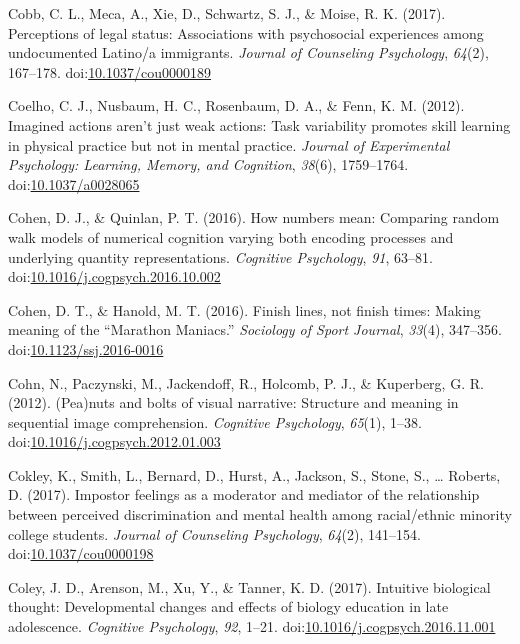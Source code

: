 \documentclass[english,man]{apa6}
\theoremstyle{definition}
\theoremstyle{definition}
\theoremstyle{definition}
\theoremstyle{remark}
\begin{document}
\hypertarget{ref-Cobb2017}{}
Cobb, C. L., Meca, A., Xie, D., Schwartz, S. J., \& Moise, R. K. (2017).
Perceptions of legal status: Associations with psychosocial experiences
among undocumented Latino/a immigrants. \emph{Journal of Counseling
Psychology}, \emph{64}(2), 167--178.
doi:\href{https://doi.org/10.1037/cou0000189}{10.1037/cou0000189}

\hypertarget{ref-Coelho2012}{}
Coelho, C. J., Nusbaum, H. C., Rosenbaum, D. A., \& Fenn, K. M. (2012).
Imagined actions aren't just weak actions: Task variability promotes
skill learning in physical practice but not in mental practice.
\emph{Journal of Experimental Psychology: Learning, Memory, and
Cognition}, \emph{38}(6), 1759--1764.
doi:\href{https://doi.org/10.1037/a0028065}{10.1037/a0028065}

\hypertarget{ref-Cohen2016}{}
Cohen, D. J., \& Quinlan, P. T. (2016). How numbers mean: Comparing
random walk models of numerical cognition varying both encoding
processes and underlying quantity representations. \emph{Cognitive
Psychology}, \emph{91}, 63--81.
doi:\href{https://doi.org/10.1016/j.cogpsych.2016.10.002}{10.1016/j.cogpsych.2016.10.002}

\hypertarget{ref-Cohen2016a}{}
Cohen, D. T., \& Hanold, M. T. (2016). Finish lines, not finish times:
Making meaning of the ``Marathon Maniacs.'' \emph{Sociology of Sport
Journal}, \emph{33}(4), 347--356.
doi:\href{https://doi.org/10.1123/ssj.2016-0016}{10.1123/ssj.2016-0016}

\hypertarget{ref-Cohn2012}{}
Cohn, N., Paczynski, M., Jackendoff, R., Holcomb, P. J., \& Kuperberg,
G. R. (2012). (Pea)nuts and bolts of visual narrative: Structure and
meaning in sequential image comprehension. \emph{Cognitive Psychology},
\emph{65}(1), 1--38.
doi:\href{https://doi.org/10.1016/j.cogpsych.2012.01.003}{10.1016/j.cogpsych.2012.01.003}

\hypertarget{ref-Cokley2017}{}
Cokley, K., Smith, L., Bernard, D., Hurst, A., Jackson, S., Stone, S.,
\ldots{} Roberts, D. (2017). Impostor feelings as a moderator and
mediator of the relationship between perceived discrimination and mental
health among racial/ethnic minority college students. \emph{Journal of
Counseling Psychology}, \emph{64}(2), 141--154.
doi:\href{https://doi.org/10.1037/cou0000198}{10.1037/cou0000198}

\hypertarget{ref-Coley2017}{}
Coley, J. D., Arenson, M., Xu, Y., \& Tanner, K. D. (2017). Intuitive
biological thought: Developmental changes and effects of biology
education in late adolescence. \emph{Cognitive Psychology}, \emph{92},
1--21.
doi:\href{https://doi.org/10.1016/j.cogpsych.2016.11.001}{10.1016/j.cogpsych.2016.11.001}
\end{document}

